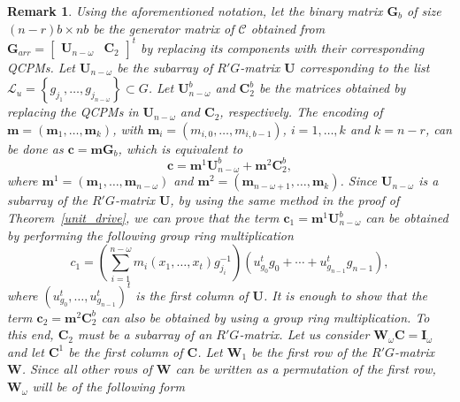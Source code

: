 \documentclass[journal,draftclsnofoot,onecolumn,12pt,twoside]{IEEEtran}
\newtheorem{rem}{Remark}[section]
\begin{document}
\begin{rem}\label{rem1}
Using the aforementioned notation, let the binary matrix $\mathbf{G}_b$ of size $(n-r)b\times nb$ be the generator matrix of $\mathcal{C}$  obtained from $\mathbf{G}_{arr}=\left[\begin{array}{cc}
 \mathbf{U}_{n-\omega} & \mathbf{C}_2
\end{array}\right]^t$ by replacing its components with their corresponding QCPMs. Let $ \mathbf{U}_{n-\omega}$ be the subarray of $R'G$-matrix $\mathbf{U}$ corresponding to the list $\mathcal{L}_u=\left\{g_{j_1},\ldots ,g_{j_{n-\omega}} \right\}\subset G$.
Let $\mathbf{U}_{n-\omega}^b$ and $\mathbf{C}_2^b$ be the matrices obtained by replacing the QCPMs in $\mathbf{U}_{n-\omega}$ and $\mathbf{C}_2$, respectively.
The encoding of $\mathbf{m}=(\mathbf{m}_1,\ldots ,\mathbf{m}_k)$, with $\mathbf{m}_i=(m_{i,0},\ldots ,m_{i,b-1})$, $i=1,\ldots,k$ and $k=n-r$, can be done as $\mathbf{c}=\mathbf{m}\mathbf{G}_b$, which is equivalent to
\begin{equation}\label{enc}
\mathbf{c}= \mathbf{m}^1\mathbf{U}_{n-\omega}^b+\mathbf{m}^2 \mathbf{C}_2^b,
\end{equation}
where $\mathbf{m}^1=(\mathbf{m}_1,\ldots,\mathbf{m}_{n-\omega})$ and $\mathbf{m}^2=(\mathbf{m}_{n-\omega+1},\ldots , \mathbf{m}_k)$.  Since $\mathbf{U}_{n-\omega}$ is a subarray of the $R'G$-matrix $\mathbf{U}$, by using the same method in the proof of  Theorem~\ref{unit_drive}, we can prove that the term $\mathbf{c}_1=\mathbf{m}^1\mathbf{U}_{n-\omega}^b$ can be obtained by performing the following group ring multiplication
\begin{equation*}%
 c_1= \left(\sum_{i=1}^{n-\omega}m_i(x_1,\ldots ,x_t)g_{j_i}^{-1} \right)(u_{g_{0}}^tg_{0}+\cdots +u_{g_{n-1}}^tg_{n-1}),
\end{equation*}
where $(u_{g_{0}}^t,\ldots ,u_{g_{n-1}}^t)^t$ is the first column of $\mathbf{U}$. It is enough to show that the term $\mathbf{c}_2=\mathbf{m}^2 \mathbf{C}_2^b$ can also be obtained by using a group ring multiplication. To this end, $\mathbf{C}_2$ must be a subarray of an $R'G$-matrix. Let us consider $\mathbf{W}_{\omega}\mathbf{C}=\mathbf{I}_{\omega}$ and let $\mathbf{C}^1$ be the first column of $\mathbf{C}$. Let $\mathbf{W}_1$ be the first row of the $R'G$-matrix $\mathbf{W}$. Since all other rows of $\mathbf{W}$ can be written as a permutation of the first row, $\mathbf{W}_{\omega}$ will be of the following form
\begin{eqnarray}

\end{eqnarray}
\end{rem}
\end{document}
